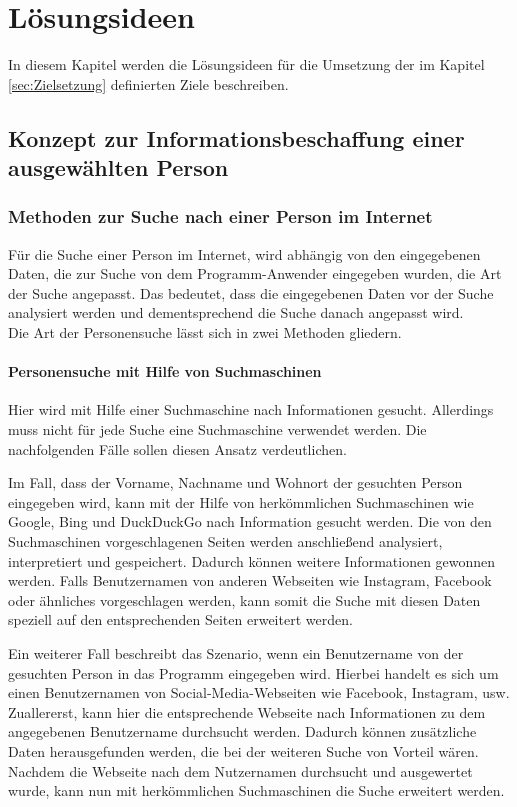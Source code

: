 
\chapter{Lösungsideen}  %
\label{cha:Lösungsideen} %
In diesem Kapitel werden die Lösungsideen für die Umsetzung der im Kapitel \ref{sec:Zielsetzung} definierten Ziele beschreiben.

\section{Konzept zur Informationsbeschaffung einer ausgewählten Person}	
	\subsection{Methoden zur Suche nach einer Person im Internet}
	\label{sec:Suche nach Information}
	Für die Suche einer Person im Internet, wird abhängig von den eingegebenen Daten, die zur Suche von dem Programm-Anwender eingegeben wurden, die Art der Suche angepasst. Das bedeutet, dass die eingegebenen Daten vor der Suche analysiert werden und dementsprechend die Suche danach angepasst wird. \\
	Die Art der Personensuche lässt sich in zwei Methoden gliedern.
		\subsubsection{Personensuche mit Hilfe von Suchmaschinen}
		\label{subsubsec:PersonensucheMitHilfevonSuchmaschine}
		Hier wird mit Hilfe einer Suchmaschine nach Informationen gesucht. Allerdings muss nicht für jede Suche eine Suchmaschine verwendet werden. Die nachfolgenden Fälle sollen diesen Ansatz verdeutlichen.
		
		Im Fall, dass der Vorname, Nachname und Wohnort der gesuchten Person eingegeben wird, kann mit der Hilfe von herkömmlichen Suchmaschinen wie Google, Bing und DuckDuckGo nach Information gesucht werden. Die von den Suchmaschinen vorgeschlagenen Seiten werden anschließend analysiert, interpretiert und gespeichert. Dadurch können weitere Informationen gewonnen werden. Falls Benutzernamen von anderen Webseiten wie Instagram, Facebook oder ähnliches vorgeschlagen werden, kann somit die Suche mit diesen Daten speziell auf den entsprechenden Seiten erweitert werden.
		
		Ein weiterer Fall beschreibt das Szenario, wenn ein Benutzername von der gesuchten Person in das Programm eingegeben wird. Hierbei handelt es sich um einen Benutzernamen von Social-Media-Webseiten wie Facebook, Instagram, usw. Zuallererst, kann hier die entsprechende Webseite nach Informationen zu dem angegebenen Benutzername durchsucht werden. Dadurch können zusätzliche Daten herausgefunden werden, die bei der weiteren Suche von Vorteil wären.
		Nachdem die Webseite nach dem Nutzernamen durchsucht und ausgewertet wurde, kann nun mit herkömmlichen Suchmaschinen die Suche erweitert werden.
		
